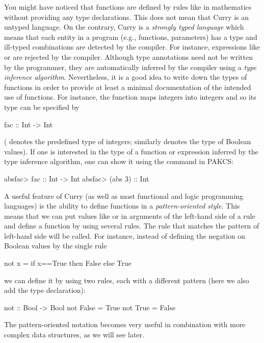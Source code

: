 You might have noticed that functions are defined by rules
like in mathematics without providing any type declarations.
This does not mean that Curry is an untyped language.  On the contrary, Curry is a \emph{strongly typed language}
which means that each entity in a program (e.g., functions, parameters)
has a type and ill-typed combinations are detected
by the compiler. For instance, expressions like
 or  are rejected by the compiler.
Although type annotations need not be written by the programmer,
they are automatically inferred by the compiler
using a \emph{type inference algorithm}.
Nevertheless, it is a good idea to write down the types
of functions in order to provide at least a minimal documentation
of the intended use of functions. For instance,
the function  maps integers into integers and so
its type can be specified by
\begin{prog}
fac :: Int -> Int
\end{prog}
( denotes the predefined type of integers; similarly
 denotes the type of Boolean values).
If one is interested in the type of a function or expression
inferred by the type inference algorithm, one can show it
using the command  in PAKCS:
\begin{prog}
absfac> 
fac :: Int -> Int
absfac> 
(abs 3) :: Int
\end{prog}
%
A useful feature of Curry (as well as most functional and logic
programming languages) is the ability to define
functions in a \emph{pattern-oriented style}.
This means that we can put values like  or 
in arguments of the left-hand side of a rule
and define a function by using several rules.  The rule that matches the pattern of left-hand side will be called.   
For instance, instead of defining the negation on Boolean values by
the single rule
\begin{prog}
not x = if x==True then False
                   else True
\end{prog}
we can define it by using two rules, each with a different pattern (here we
also add the type declaration):
\begin{prog}
not :: Bool -> Bool
not False = True
not True  = False
\end{prog}
The pattern-oriented notation becomes very useful in combination
with more complex data structures, as we will see later.

